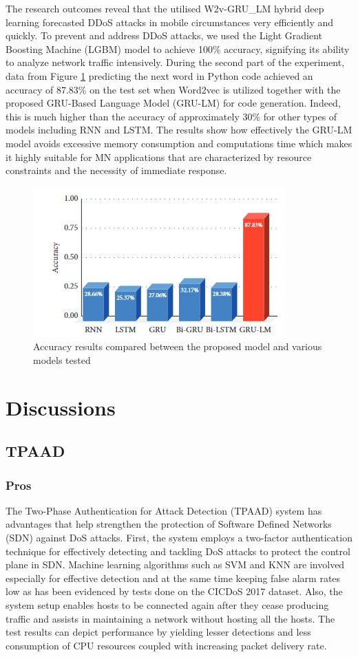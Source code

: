 \documentclass[a4paper, 12pt]{article}
\begin{document}
The research outcomes reveal that the utilised W2v-GRU\_LM hybrid deep learning forecasted DDoS attacks in mobile circumstances very efficiently and quickly. To prevent and address DDoS attacks, we used the Light Gradient Boosting Machine (LGBM) model to achieve 100\% accuracy, signifying its ability to analyze network traffic intensively. During the second part of the experiment, data from Figure \ref{fig:grulm} predicting the next word in Python code achieved an accuracy of 87.83\% on the test set when Word2vec is utilized together with the proposed GRU-Based Language Model (GRU-LM) for code generation. Indeed, this is much higher than the accuracy of approximately 30\% for other types of models including RNN and LSTM. The results show how effectively the GRU-LM model avoids excessive memory consumption and computations time which makes it highly suitable for MN applications that are characterized by resource constraints and the necessity of immediate response. 

\begin{figure}[H]
    \centering
    \includegraphics[width=0.7\linewidth]{image.png}
    \caption{Accuracy results compared between the proposed model and various models tested \protect{}}
    \label{fig:grulm}
\end{figure}

\clearpage

\section{Discussions}
\subsection{TPAAD}
\subsubsection{Pros}
The Two-Phase Authentication for Attack Detection (TPAAD) system has advantages that help strengthen the protection of Software Defined Networks (SDN) against DoS attacks. First, the system employs a two-factor authentication technique for effectively detecting and tackling DoS attacks to protect the control plane in SDN. Machine learning algorithms such as SVM and KNN are involved especially for effective detection and at the same time keeping false alarm rates low as has been evidenced by tests done on the CICDoS 2017 dataset. Also, the system setup enables hosts to be connected again after they cease producing traffic and assists in maintaining a network without hosting all the hosts. The test results can depict performance by yielding lesser detections and less consumption of CPU resources coupled with increasing packet delivery rate. 
\end{document}
